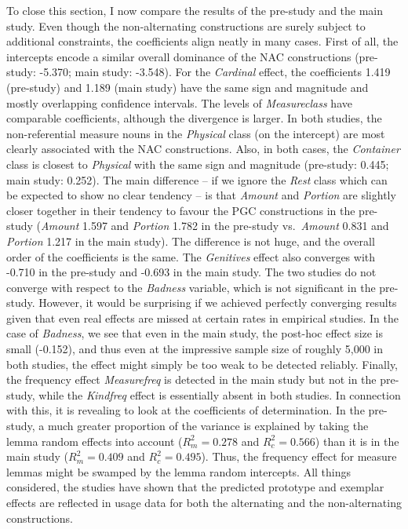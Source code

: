To close this section, I now compare the results of the pre-study and the main study.
Even though the non-alternating constructions are surely subject to additional constraints, the coefficients align neatly in many cases.
First of all, the intercepts encode a similar overall dominance of the NAC constructions (pre-study: -5.370; main study: -3.548).
For the \textit{Cardinal} effect, the coefficients 1.419 (pre-study) and 1.189 (main study) have the same sign and magnitude and mostly overlapping confidence intervals.
The levels of \textit{Measureclass} have comparable coefficients, although the divergence is larger.
In both studies, the non-referential measure nouns in the \textit{Physical} class (on the intercept) are most clearly associated with the NAC constructions.
Also, in both cases, the \textit{Container} class is closest to \textit{Physical} with the same sign and magnitude (pre-study: 0.445; main study: 0.252).
The main difference -- if we ignore the \textit{Rest} class which can be expected to show no clear tendency -- is that \textit{Amount} and \textit{Portion} are slightly closer together in their tendency to favour the PGC constructions in the pre-study (\textit{Amount} 1.597 and \textit{Portion} 1.782 in the pre-study vs.\ \textit{Amount} 0.831 and \textit{Portion} 1.217 in the main study).
The difference is not huge, and the overall order of the coefficients is the same.
The \textit{Genitives} effect also converges with -0.710 in the pre-study and -0.693 in the main study.
The two studies do not converge with respect to the \textit{Badness} variable, which is not significant in the pre-study.
However, it would be surprising if we achieved perfectly converging results given that even real effects are missed at certain rates in empirical studies.
In the case of \textit{Badness}, we see that even in the main study, the post-hoc effect size is small (-0.152), and thus even at the impressive sample size of roughly 5,000 in both studies, the effect might simply be too weak to be detected reliably.
Finally, the frequency effect \textit{Measurefreq} is detected in the main study but not in the pre-study, while the \textit{Kindfreq} effect is essentially absent in both studies.
In connection with this, it is revealing to look at the coefficients of determination.
In the pre-study, a much greater proportion of the variance is explained by taking the lemma random effects into account ($R^2_m=0.278$ and $R^2_c=0.566$) than it is in the main study ($R^2_m=0.409$ and $R^2_c=0.495$).
Thus, the frequency effect for measure lemmas might be swamped by the lemma random intercepts.
All things considered, the studies have shown that the predicted prototype and exemplar effects are reflected in usage data for both the alternating and the non-alternating constructions.
